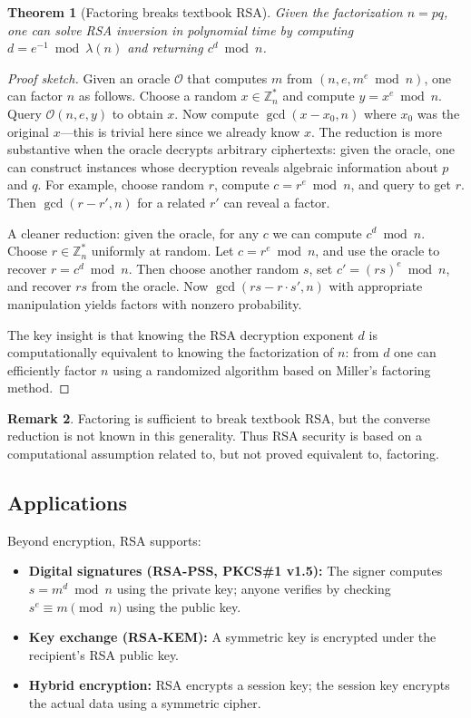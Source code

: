 \documentclass[twoside,12pt]{book}
\theoremstyle{plain}
\newtheorem{theorem}{Theorem}[chapter]
\theoremstyle{definition}
\newtheorem{remark}[theorem]{Remark}
\theoremstyle{remark}
\begin{document}
\begin{theorem}[Factoring breaks textbook RSA]
\label{thm:rsa-factoring}
Given the factorization $n=pq$, one can solve RSA inversion in polynomial
time by computing $d=e^{-1}\bmod\lambda(n)$ and returning $c^d\bmod n$.
\end{theorem}

\begin{proof}[Proof sketch]
Given an oracle $\mathcal{O}$ that computes $m$ from $(n, e, m^e \bmod n)$, one can factor $n$ as follows. Choose a random $x \in \mathbb{Z}_n^*$ and compute $y = x^e \bmod n$. Query $\mathcal{O}(n, e, y)$ to obtain $x$. Now compute $\gcd(x - x_0, n)$ where $x_0$ was the original $x$---this is trivial here since we already know $x$. The reduction is more substantive when the oracle decrypts arbitrary ciphertexts: given the oracle, one can construct instances whose decryption reveals algebraic information about $p$ and $q$. For example, choose random $r$, compute $c = r^e \bmod n$, and query to get $r$. Then $\gcd(r - r', n)$ for a related $r'$ can reveal a factor.

A cleaner reduction: given the oracle, for any $c$ we can compute $c^d \bmod n$. Choose $r \in \mathbb{Z}_n^*$ uniformly at random. Let $c = r^e \bmod n$, and use the oracle to recover $r = c^d \bmod n$. Then choose another random $s$, set $c' = (rs)^e \bmod n$, and recover $rs$ from the oracle. Now $\gcd(rs - r \cdot s', n)$ with appropriate manipulation yields factors with nonzero probability.

The key insight is that knowing the RSA decryption exponent $d$ is computationally equivalent to knowing the factorization of $n$: from $d$ one can efficiently factor $n$ using a randomized algorithm based on Miller's factoring method.
\end{proof}

\begin{remark}
Factoring is sufficient to break textbook RSA, but the converse reduction is
not known in this generality. Thus RSA security is based on a computational
assumption related to, but not proved equivalent to, factoring.
\end{remark}

\subsection{Applications}

Beyond encryption, RSA supports:
\begin{itemize}[nosep]
    \item \textbf{Digital signatures (RSA-PSS, PKCS\#1 v1.5):} The signer computes $s = m^d \bmod n$ using the private key; anyone verifies by checking $s^e \equiv m \pmod{n}$ using the public key.
    \item \textbf{Key exchange (RSA-KEM):} A symmetric key is encrypted under the recipient's RSA public key.
    \item \textbf{Hybrid encryption:} RSA encrypts a session key; the session key encrypts the actual data using a symmetric cipher.
\end{itemize}
\end{document}
